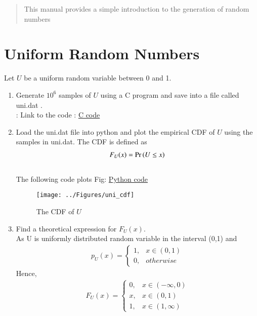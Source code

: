 \documentclass[journal,12pt,twocolumn]{IEEEtran}
\renewcommand\thesection{\arabic{section}}
\begin{document}
\author{Aniket Tukaram Satpute}

\begin{abstract}
This manual provides a simple introduction to the generation of random numbers
\end{abstract}
\section{Uniform Random Numbers}
Let $U$ be a uniform random variable between 0 and 1.
\begin{enumerate}[label=\thesection.\arabic*
,ref=\thesection.\theenumi]
\item Generate $10^6$ samples of $U$ using a C program and save into a file called uni.dat .
\\
\solution : Link to the code : \href{https://github.com/anikettsatpute/Probability-and-Random-Variable-Assignment/blob/main/code/code1_1.c}{C code}
%
\vspace{0.2in}
\item
Load the uni.dat file into python and plot the empirical CDF of $U$ using the samples in uni.dat. The CDF is defined as
\begin{align}
F_{U}(x) = \Pr\left(U \le x\right)
\end{align}
\\
\solution  The following code plots Fig: \href{https://github.com/anikettsatpute/Probability-and-Random-Variable-Assignment/blob/main/code/code1_2.py}{Python code} 
\begin{figure}[h]
\texttt{[image: ../Figures/uni\_cdf]}
\caption{The CDF of $U$}
\label{fig:uni_cdf}
\end{figure}
%
\item
Find a  theoretical expression for $F_{U}(x)$.\\
\solution As U is uniformly distributed random variable in the interval (0,1) and
\begin{align}
p_U(x) = 
\begin{cases}
1, & x \in (0, 1) \\
0, & otherwise
\end{cases}
\end{align}
Hence,
\begin{align}
F_U(x) = 
\begin{cases}
0, & x \in (-\infty,0) \\
x, & x \in (0,1)\\
1, & x \in (1,\infty)
\end{cases}
\end{align}


\end{enumerate}
\end{document}
